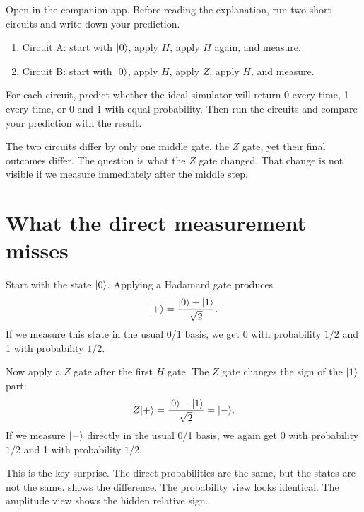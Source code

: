 \begin{tryit}
Open  in the companion app. Before reading the explanation, run two short circuits and write down your prediction.

\begin{enumerate}
  \item Circuit A: start with $\lvert 0\rangle$, apply $H$, apply $H$ again, and measure.
  \item Circuit B: start with $\lvert 0\rangle$, apply $H$, apply $Z$, apply $H$, and measure.
\end{enumerate}

For each circuit, predict whether the ideal simulator will return 0 every time, 1 every time, or 0 and 1 with equal probability. Then run the circuits and compare your prediction with the result.
\end{tryit}

The two circuits differ by only one middle gate, the $Z$ gate, yet their final outcomes differ. The question is what the $Z$ gate changed. That change is not visible if we measure immediately after the middle step.

\section{What the direct measurement misses}
\label{sec:ch06-direct-measurement-misses}

Start with the state $\lvert 0\rangle$. Applying a Hadamard gate produces
\begin{equation}
\lvert +\rangle=\frac{\lvert 0\rangle+\lvert 1\rangle}{\sqrt{2}}.
\label{eq:ket-plus}
\end{equation}
If we measure this state in the usual 0/1 basis, we get 0 with probability $1/2$ and 1 with probability $1/2$.

Now apply a $Z$ gate after the first $H$ gate. The $Z$ gate changes the sign of the $\lvert 1\rangle$ part:
\begin{equation}
Z\lvert +\rangle=\frac{\lvert 0\rangle-\lvert 1\rangle}{\sqrt{2}}=\lvert -\rangle.
\label{eq:z-creates-ket-minus}
\end{equation}
If we measure $\lvert -\rangle$ directly in the usual 0/1 basis, we again get 0 with probability $1/2$ and 1 with probability $1/2$.

This is the key surprise. The direct probabilities are the same, but the states are not the same.  shows the difference. The probability view looks identical. The amplitude view shows the hidden relative sign.

